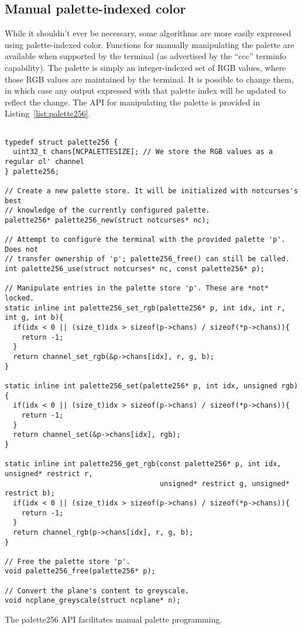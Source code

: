 \subsection{Manual palette-indexed color}
\label{sec:palettes}
While it shouldn't ever be necessary, some algorithms are more easily expressed
using palette-indexed color. Functions for manually manipulating the palette
are available when supported by the terminal (as advertised by the ``ccc''
terminfo capability). The palette is simply an integer-indexed set of RGB values,
where those RGB values are maintained by the terminal. It is possible to change
them, in which case any output expressed with that palette index will be updated
to reflect the change. The API for manipulating the palette is provided in
Listing~\ref{list:palette256}.
\begin{listing}[!htb]
\begin{verbatim}

typedef struct palette256 {
  uint32_t chans[NCPALETTESIZE]; // We store the RGB values as a regular ol' channel
} palette256;

// Create a new palette store. It will be initialized with notcurses's best
// knowledge of the currently configured palette.
palette256* palette256_new(struct notcurses* nc);

// Attempt to configure the terminal with the provided palette 'p'. Does not
// transfer ownership of 'p'; palette256_free() can still be called.
int palette256_use(struct notcurses* nc, const palette256* p);

// Manipulate entries in the palette store 'p'. These are *not* locked.
static inline int palette256_set_rgb(palette256* p, int idx, int r, int g, int b){
  if(idx < 0 || (size_t)idx > sizeof(p->chans) / sizeof(*p->chans)){
    return -1;
  }
  return channel_set_rgb(&p->chans[idx], r, g, b);
}

static inline int palette256_set(palette256* p, int idx, unsigned rgb){
  if(idx < 0 || (size_t)idx > sizeof(p->chans) / sizeof(*p->chans)){
    return -1;
  }
  return channel_set(&p->chans[idx], rgb);
}

static inline int palette256_get_rgb(const palette256* p, int idx, unsigned* restrict r,
                                     unsigned* restrict g, unsigned* restrict b);
  if(idx < 0 || (size_t)idx > sizeof(p->chans) / sizeof(*p->chans)){
    return -1;
  }
  return channel_rgb(p->chans[idx], r, g, b);
}

// Free the palette store 'p'.
void palette256_free(palette256* p);

// Convert the plane's content to greyscale.
void ncplane_greyscale(struct ncplane* n);
\end{verbatim}
\caption{The palette256 API facilitates manual palette programming.}
\label{list:palette256}
\end{listing}

